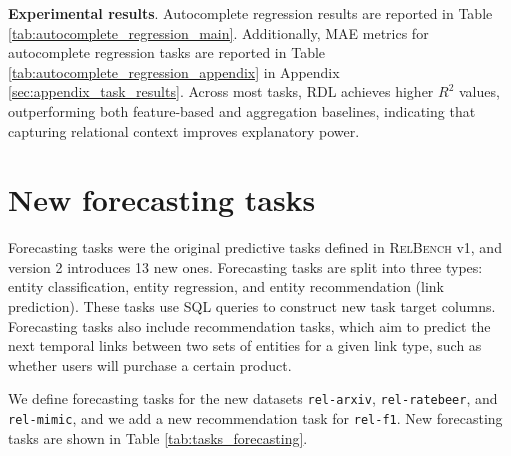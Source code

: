 \documentclass{article} %
\newcommand{\fone}{\texttt{rel-f1}\xspace}
\newcommand{\relbench}{\textsc{RelBench}\xspace}
\newcommand{\ratebeer}{\texttt{rel-ratebeer}\xspace}
\newcommand{\mimic}{\texttt{rel-mimic}\xspace}
\newcommand{\arxiv}{\texttt{rel-arxiv}\xspace}
\begin{document}
\textbf{Experimental results}. Autocomplete regression results are reported in Table \ref{tab:autocomplete_regression_main}. Additionally, MAE metrics for autocomplete regression tasks are reported in Table \ref{tab:autocomplete_regression_appendix} in Appendix \ref{sec:appendix_task_results}. Across most tasks, RDL achieves higher $R^2$ values, outperforming both feature-based and aggregation baselines, indicating that capturing relational context improves explanatory power.


\begin{table}[t]
  \centering
  \caption{{\bf Autocomplete regression results on \relbench.} Regression uses the $R^2$ metric (higher is better). Best values are in bold. See Table \ref{tab:autocomplete_regression_r2_appendix} for standard deviations and Table \ref{tab:autocomplete_regression_appendix} for MAE results.}
  \label{tab:autocomplete_regression_main}
  \renewcommand{\arraystretch}{1.1}
  \vspace{-5pt}
  \scriptsize
    \resizebox{\textwidth}{!}{
    
    }
  \vspace{-10pt}
\end{table}




\section{New forecasting tasks} \label{sec:forecasting-tasks}

Forecasting tasks were the original predictive tasks defined in \relbench v1, and version 2 introduces 13 new ones. Forecasting tasks are split into three types: entity classification, entity regression, and entity recommendation (link prediction). These tasks use SQL queries to construct new task target columns. Forecasting tasks also include recommendation tasks, which aim to predict the next temporal links between two sets of entities for a given link type, such as whether users will purchase a certain product.

We define forecasting tasks for the new datasets \arxiv, \ratebeer, and \mimic, and we add a new recommendation task for \fone. New forecasting tasks are shown in Table \ref{tab:tasks_forecasting}.

\begin{table}[t]
  \centering
  \caption{\textbf{Full list of new forecasting tasks}. Forecasting tasks make predictions on new target columns created using SQL queries.}
  \label{tab:tasks_forecasting}
  \renewcommand{\arraystretch}{1.1}
  \scriptsize
  \vspace{-5pt}
  \resizebox{\textwidth}{!}{
    
  }
  \vspace{-10pt}
\end{table}
\end{document}
